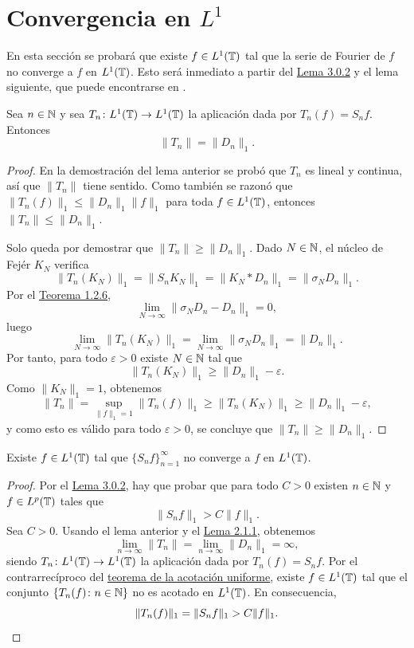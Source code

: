 \documentclass[a4paper, 12pt, oneside]{book}
\begin{document}
\section[Convergencia en \texorpdfstring{$L^1$}{L1}]{Convergencia en \texorpdfstring{\boldmath$L^1$}{L1}}

En esta sección se probará que existe $f \in L^1(\mathbb T)$ tal que la serie de Fourier de $f$ no converge a $f$ en $L^1(\mathbb T)$. Esto será inmediato a partir del \hyperref[3.0.2]{\color{blue}Lema 3.0.2} y el lema siguiente, que puede encontrarse en \cite{katznelson}.

\begin{lemma}
    Sea $n \in \mathbb N$ y sea $T_n \colon L^1(\mathbb T) \to L^1(\mathbb T)$ la aplicación dada por $T_n(f) = S_nf$. Entonces
    \[\|T_n\| = \|D_n\|_1.\]
\end{lemma}

\begin{proof}
    En la demostración del lema anterior se probó que $T_n$ es lineal y continua, así que $\|T_n\|$ tiene sentido. Como también se razonó que $\|T_n(f)\|_1 \leq \|D_n\|_1\|f\|_1$ para toda $f \in L^1(\mathbb T)$, entonces $\|T_n\| \leq \|D_n\|_1$. 
    
    Solo queda por demostrar que $\|T_n\|\geq \|D_n\|_1$. Dado $N \in \mathbb N$, el núcleo de Fejér $K_N$ verifica
    \[\|T_n(K_N)\|_1 = \|S_nK_N\|_1 = \|K_N \ast D_n\|_1 = \|\sigma_ND_n\|_1.\]
    Por el \hyperref[1.2.6]{\color{blue}Teorema 1.2.6},
    \[\lim_{N\to\infty} \|\sigma_ND_n-D_n\|_1 = 0,\]
    luego
    \[\lim_{N\to\infty} \|T_n(K_N)\|_1 = \lim_{N\to\infty} \|\sigma_ND_n\|_1 = \|D_n\|_1.\]
    Por tanto, para todo $\varepsilon > 0$ existe $N \in \mathbb N$ tal que 
    \[\|T_n(K_{N})\|_1 \geq \|D_n\|_1-\varepsilon.\]
    Como $\|K_N\|_1=1$, obtenemos
    \[\|T_n\| = \sup_{\|f\|_1=1} \|T_n(f)\|_1 \geq \|T_n(K_N)\|_1 \geq \|D_n\|_1-\varepsilon,\]
    y como esto es válido para todo $\varepsilon>0$, se concluye que $\|T_n\| \geq \|D_n\|_1$.
\end{proof}

\begin{theorem}
    Existe $f \in L^1(\mathbb T)$ tal que $\{S_nf\}_{n=1}^\infty$ no converge a $f$ en $L^1(\mathbb T)$.
\end{theorem}

\begin{proof}
    Por el \hyperref[3.0.2]{\color{blue}Lema 3.0.2}, hay que probar que para todo $C > 0$ existen $n \in \mathbb N$ y $f \in L^p(\mathbb T)$ tales que
    \[\|S_nf\|_1 > C\|f\|_1.\]
    Sea $C>0$. Usando el lema anterior y el \hyperref[2.1.1]{\color{blue}Lema 2.1.1}, obtenemos
    \[\lim_{n\to\infty} \|T_n\| = \lim_{n\to\infty}\|D_n\|_1 = \infty,\]
    siendo $T_n \colon L^1(\mathbb T) \to L^1(\mathbb T)$ la aplicación dada por $T_n(f) = S_nf$. Por el contrarrecíproco del \hyperref[1.2.2]{\color{blue}teorema de la acotación uniforme}, existe $f \in L^1(\mathbb T)$ tal que el conjunto $\{T_n(f) \colon n \in \mathbb N\}$ no es acotado en $L^1(\mathbb T)$. En consecuencia,
    \[\|T_n(f)\|_1 = \|S_nf\|_1 > C\|f\|_1. \qedhere\]
\end{proof}
\end{document}
